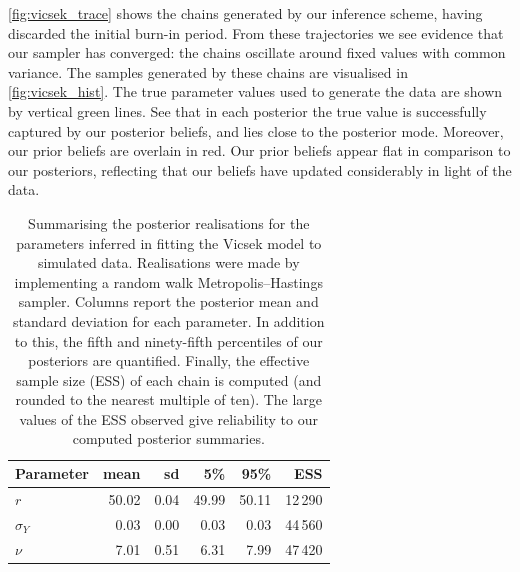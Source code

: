 \cref{fig:vicsek_trace} shows the chains generated by our inference scheme,
having discarded the initial burn-in period. From these trajectories we see
evidence that our sampler has converged: the chains oscillate around fixed
values with common variance. The samples generated by these chains are
visualised in \cref{fig:vicsek_hist}. The true parameter values used to
generate the data are shown by vertical green lines. See that in each posterior
the true value is successfully captured by our posterior beliefs, and lies
close to the posterior mode. Moreover, our prior beliefs are overlain in red.
Our prior beliefs appear flat in comparison to our posteriors, reflecting that
our beliefs have updated considerably in light of the data.

\begin{table}[tbp]
  \begin{tabular}{@{}lrrrrr@{}}
    \toprule
    Parameter    & mean  & sd   & 5\%   & 95\%  & ESS     \\
    \midrule
    $r$          & 50.02 & 0.04 & 49.99 & 50.11 & 12\,290 \\
    $\sigma_{Y}$ & 0.03  & 0.00 & 0.03  & 0.03  & 44\,560 \\
    $\nu$        & 7.01  & 0.51 & 6.31  & 7.99  & 47\,420 \\
    \bottomrule
  \end{tabular}
  \caption{Summarising the posterior realisations for the parameters inferred
    in fitting the Vicsek model to simulated data. Realisations were made by
    implementing a random walk Metropolis--Hastings sampler. Columns report
    the posterior mean and standard deviation for each parameter. In addition
    to this, the fifth and ninety-fifth percentiles of our posteriors are
    quantified. Finally, the effective sample size (ESS) of each chain is
    computed (and rounded to the nearest multiple of ten). The large values
    of the ESS observed give reliability to our computed posterior summaries.}
  \label{tab:vicsek_summary}
\end{table}%
